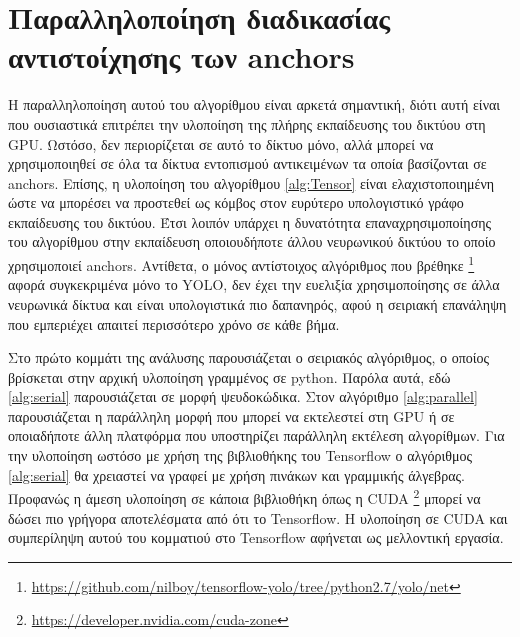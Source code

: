 \section{Παραλληλοποίηση διαδικασίας αντιστοίχησης των anchors}
\label{subsection:par_anchor_alg}

Η παραλληλοποίηση αυτού του αλγορίθμου είναι αρκετά σημαντική, διότι αυτή είναι που ουσιαστικά επιτρέπει την υλοποίηση της πλήρης εκπαίδευσης του δικτύου στη GPU. Ωστόσο, δεν περιορίζεται σε αυτό το δίκτυο μόνο, αλλά μπορεί να χρησιμοποιηθεί σε όλα τα δίκτυα εντοπισμού αντικειμένων τα οποία βασίζονται σε anchors. Επίσης, η υλοποίηση του αλγορίθμου \ref{alg:Tensor} είναι ελαχιστοποιημένη ώστε να μπορέσει να προστεθεί ως κόμβος στον ευρύτερο υπολογιστικό γράφο εκπαίδευσης του δικτύου. Έτσι λοιπόν υπάρχει η δυνατότητα επαναχρησιμοποίησης του αλγορίθμου στην εκπαίδευση οποιουδήποτε άλλου νευρωνικού δικτύου το οποίο χρησιμοποιεί anchors. Αντίθετα, ο μόνος αντίστοιχος αλγόριθμος που βρέθηκε \footnote{\url{https://github.com/nilboy/tensorflow-yolo/tree/python2.7/yolo/net}} αφορά συγκεκριμένα μόνο το YOLO, δεν έχει την ευελιξία χρησιμοποίησης σε άλλα νευρωνικά δίκτυα και είναι υπολογιστικά πιο δαπανηρός, αφού η σειριακή επανάληψη που εμπεριέχει απαιτεί περισσότερο χρόνο σε κάθε βήμα.

Στο πρώτο κομμάτι της ανάλυσης παρουσιάζεται ο σειριακός αλγόριθμος, ο οποίος βρίσκεται στην αρχική υλοποίηση γραμμένος σε python. Παρόλα αυτά, εδώ \ref{alg:serial} παρουσιάζεται σε μορφή ψευδοκώδικα. Στον αλγόριθμο \ref{alg:parallel} παρουσιάζεται η παράλληλη μορφή που μπορεί να εκτελεστεί στη GPU ή σε οποιαδήποτε άλλη πλατφόρμα που υποστηρίζει παράλληλη εκτέλεση αλγορίθμων. Για την υλοποίηση ωστόσο με χρήση της βιβλιοθήκης του Tensorflow ο αλγόριθμος \ref{alg:serial} θα χρειαστεί να γραφεί με χρήση πινάκων και γραμμικής άλγεβρας. Προφανώς η άμεση υλοποίηση σε κάποια βιβλιοθήκη όπως η CUDA \footnote{\url{https://developer.nvidia.com/cuda-zone}} μπορεί να δώσει πιο γρήγορα αποτελέσματα από ότι το Tensorflow. Η υλοποίηση σε CUDA και συμπερίληψη αυτού του κομματιού στο Tensorflow αφήνεται ως μελλοντική εργασία.

